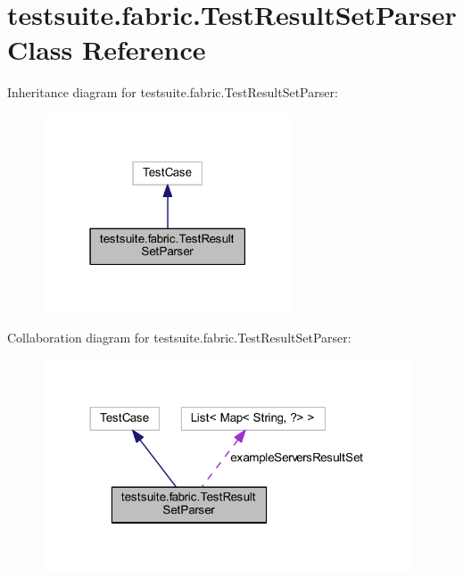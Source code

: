 \hypertarget{classtestsuite_1_1fabric_1_1_test_result_set_parser}{}\section{testsuite.\+fabric.\+Test\+Result\+Set\+Parser Class Reference}
\label{classtestsuite_1_1fabric_1_1_test_result_set_parser}


Inheritance diagram for testsuite.\+fabric.\+Test\+Result\+Set\+Parser\+:
\nopagebreak
\begin{figure}[H]
\begin{center}
\leavevmode
\includegraphics[width=210pt]{classtestsuite_1_1fabric_1_1_test_result_set_parser__inherit__graph}
\end{center}
\end{figure}


Collaboration diagram for testsuite.\+fabric.\+Test\+Result\+Set\+Parser\+:
\nopagebreak
\begin{figure}[H]
\begin{center}
\leavevmode
\includegraphics[width=310pt]{classtestsuite_1_1fabric_1_1_test_result_set_parser__coll__graph}
\end{center}
\end{figure}
